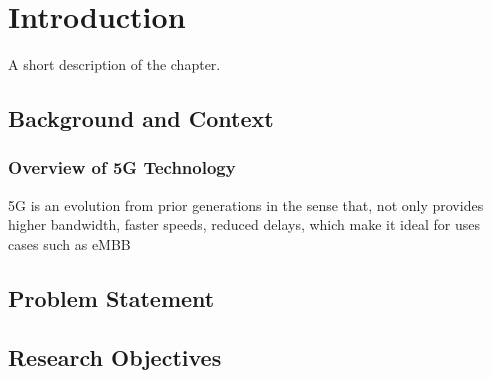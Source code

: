 \chapter{Introduction}%
\label{chapter:introduction}

\begin{introduction}
A short description of the chapter.
\end{introduction}

\section{Background and Context}

\subsection{Overview of 5G Technology}


5G is an evolution from prior generations in the sense that, not only provides higher bandwidth, faster speeds, reduced delays, which make it ideal for uses cases such as \ac{eMBB}

\section{Problem Statement}


\section{Research Objectives}


